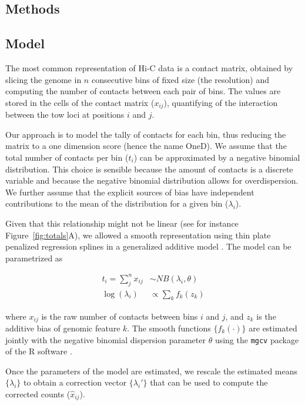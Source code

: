 \documentclass{bioinfo}
\begin{document}
\begin{methods}

\section{Methods}

\subsection{Model}
\label{sec:model}

The most common representation of Hi-C data is a contact matrix, obtained
by slicing the genome in $n$ consecutive bins of fixed size (the
resolution) and computing the number of contacts between each pair of
bins. The values are stored in the cells of the contact matrix ($x_{ij}$),
quantifying of the interaction between the tow loci at positions $i$ and
$j$.

Our approach is to model the tally of contacts for each bin, thus reducing
the matrix to a one dimension score (hence the name OneD). We assume that
the total number of contacts per bin ($t_{i}$) can be approximated by a
negative binomial distribution. This choice is sensible because the amount
of contacts is a discrete variable and because the negative binomial
distribution allows for overdispersion. We further assume that the
explicit sources of bias have independent contributions to the mean of the
distribution for a given bin ($\lambda_i$).

Given that this relationship might not be linear (see for instance
Figure~\ref{fig:totals}A), we allowed a smooth representation
using thin plate penalized regression splines \citep{wood2003thin} in a
generalized additive model \citep{wood2011fast}. The model can be
parametrized as

\begin{align*}
t_i = \sum_j^n{x_{ij}} &\sim  NB(\lambda_i, \theta) \\
\log(\lambda_i) &\propto \sum_{k}{f_k(z_k)}
\end{align*}

\noindent
where $x_{ij}$ is the raw number of contacts between bins $i$ and $j$, and
$z_k$ is the additive bias of genomic feature $k$. The smooth functions
$\{f_k(\cdot)\}$ are estimated jointly with the negative binomial
dispersion parameter $\theta$ using the \texttt{mgcv} package
\citep{wood2011fast} of the R software \citep{coreteam2014r}.

Once the parameters of the model are estimated, we rescale the estimated
means $\{\lambda_i\}$ to obtain a correction vector $\{\lambda_i'\}$ that
can be used to compute the corrected counts ($\hat{x}_{ij}$).


\end{methods}
\end{document}
